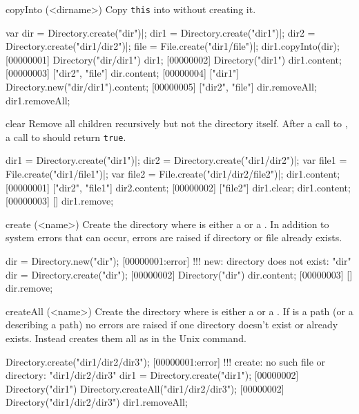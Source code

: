 \begin{urbiscriptapi}
\item[copyInto](<dirname>)
  Copy \lstinline|this| into  without creating it.
\begin{urbiscript}
var dir = Directory.create("dir")|;
dir1 = Directory.create("dir1")|;
dir2 = Directory.create("dir1/dir2")|;
file = File.create("dir1/file")|;
dir1.copyInto(dir);
[00000001] Directory("dir/dir1")
dir1;
[00000002] Directory("dir1")
dir1.content;
[00000003] ["dir2", "file"]
dir.content;
[00000004] ["dir1"]
Directory.new("dir/dir1").content;
[00000005] ["dir2", "file"]
dir.removeAll;
dir1.removeAll;
\end{urbiscript}

\item[clear]
  Remove all children recursively but not the directory itself. After a
  call to , a call to  should return
  \lstinline|true|.
\begin{urbiscript}
dir1 = Directory.create("dir1")|;
dir2 = Directory.create("dir1/dir2")|;
var file1 = File.create("dir1/file1")|;
var file2 = File.create("dir1/dir2/file2")|;
dir1.content;
[00000001] ["dir2", "file1"]
dir2.content;
[00000002] ["file2"]
dir1.clear;
dir1.content;
[00000003] []
dir1.remove;
\end{urbiscript}

\item[create](<name>)
  Create the directory  where  is either a
   or a . In addition to system errors that
  can occur, errors are raised if directory or file  already exists.
\begin{urbiscript}
dir = Directory.new("dir");
[00000001:error] !!! new: directory does not exist: "dir"
dir = Directory.create("dir");
[00000002] Directory("dir")
dir.content;
[00000003] []
dir.remove;
\end{urbiscript}

\item[createAll](<name>)
  Create the directory  where  is either a
   or a . If  is a
  path (or a  describing a path) no errors are
  raised if one directory doesn't exist or already exists. Instead
   creates them all as in the Unix  command.
\begin{urbiscript}
Directory.create("dir1/dir2/dir3");
[00000001:error] !!! create: no such file or directory: "dir1/dir2/dir3"
dir1 = Directory.create("dir1");
[00000002] Directory("dir1")
Directory.createAll("dir1/dir2/dir3");
[00000002] Directory("dir1/dir2/dir3")
dir1.removeAll;
\end{urbiscript}


\end{urbiscriptapi}
